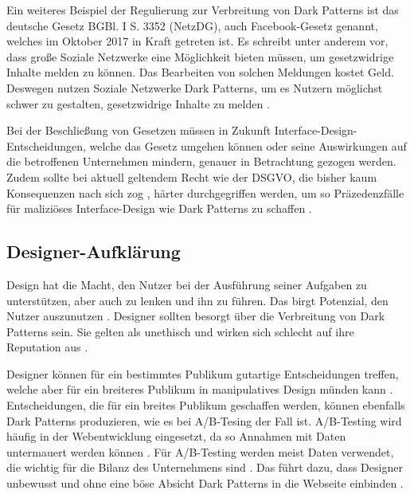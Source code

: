 \documentclass[conference,compsoc,final,a4paper]{IEEEtran}
\begin{document}
Ein weiteres Beispiel der Regulierung zur Verbreitung von Dark Patterns ist das deutsche Gesetz BGBl. I S. 3352 (\ac{NetzDG}), auch Facebook-Gesetz genannt, welches im Oktober 2017 in Kraft getreten ist. Es schreibt unter anderem vor, dass große Soziale Netzwerke eine Möglichkeit bieten müssen, um gesetzwidrige Inhalte melden zu können. Das Bearbeiten von solchen Meldungen kostet Geld. Deswegen nutzen Soziale Netzwerke Dark Patterns, um es Nutzern möglichst schwer zu gestalten, gesetzwidrige Inhalte zu melden \autocite{Rieger2020}.


Bei der Beschließung von Gesetzen müssen in Zukunft Interface-Design-Entscheidungen, welche das Gesetz umgehen können oder seine Auswirkungen auf die betroffenen Unternehmen mindern, genauer in Betrachtung gezogen werden. Zudem sollte bei aktuell geltendem Recht wie der \ac{DSGVO}, die bisher kaum Konsequenzen nach sich zog \autocite{Nouwens2020}, härter durchgegriffen werden, um so Präzedenzfälle für maliziöses Interface-Design wie Dark Patterns zu schaffen \autocite{Rieger2020}.

\subsection{Designer-Aufklärung}
Design hat die Macht, den Nutzer bei der Ausführung seiner Aufgaben zu unterstützen, aber auch zu lenken und ihn zu führen. Das birgt Potenzial, den Nutzer auszunutzen \autocites{OinasKukkonen2009}{Sengers2005}. Designer sollten besorgt über die Verbreitung von Dark Patterns sein. Sie gelten als unethisch und wirken sich schlecht auf ihre Reputation aus \autocite{Narayanan2020}.

Designer können für ein bestimmtes Publikum gutartige Entscheidungen treffen, welche aber für ein breiteres Publikum in manipulatives Design münden kann \autocite{Gray_2018}. Entscheidungen, die für ein breites Publikum geschaffen werden, können ebenfalls Dark Patterns produzieren, wie es bei A/B-Tesing der Fall ist. A/B-Testing wird häufig in der Webentwicklung eingesetzt, da so Annahmen mit Daten untermauert werden können \autocite{Kohavi2017}. Für A/B-Testing werden meist Daten verwendet, die wichtig für die Bilanz des Unternehmens sind \autocites{Kohavi2017}{Narayanan2020}. Das führt dazu, dass Designer unbewusst und ohne eine böse Absicht Dark Patterns in die Webseite einbinden \autocite{Narayanan2020}.
\end{document}
